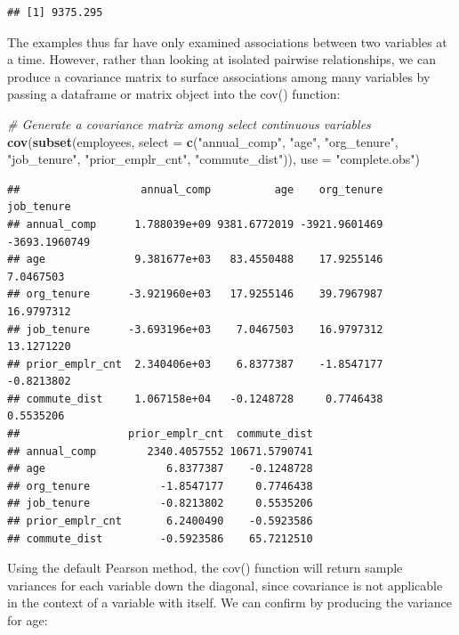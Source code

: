 \documentclass[]{book}
\newenvironment{Shaded}{\begin{snugshade}}{\end{snugshade}}
\newcommand{\CommentTok}[1]{\textcolor[rgb]{0.56,0.35,0.01}{\textit{#1}}}
\newcommand{\DataTypeTok}[1]{\textcolor[rgb]{0.13,0.29,0.53}{#1}}
\newcommand{\KeywordTok}[1]{\textcolor[rgb]{0.13,0.29,0.53}{\textbf{#1}}}
\newcommand{\NormalTok}[1]{#1}
\newcommand{\OperatorTok}[1]{\textcolor[rgb]{0.81,0.36,0.00}{\textbf{#1}}}
\newcommand{\StringTok}[1]{\textcolor[rgb]{0.31,0.60,0.02}{#1}}
\begin{document}
\begin{verbatim}
## [1] 9375.295
\end{verbatim}

The examples thus far have only examined associations between two variables at a time. However, rather than looking at isolated pairwise relationships, we can produce a covariance matrix to surface associations among many variables by passing a dataframe or matrix object into the cov() function:

\begin{Shaded}
\begin{Highlighting}[]
\CommentTok{# Generate a covariance matrix among select continuous variables}
\KeywordTok{cov}\NormalTok{(}\KeywordTok{subset}\NormalTok{(employees, }\DataTypeTok{select =} \KeywordTok{c}\NormalTok{(}\StringTok{"annual_comp"}\NormalTok{, }\StringTok{"age"}\NormalTok{, }\StringTok{"org_tenure"}\NormalTok{, }\StringTok{"job_tenure"}\NormalTok{, }\StringTok{"prior_emplr_cnt"}\NormalTok{, }\StringTok{"commute_dist"}\NormalTok{)), }\DataTypeTok{use =} \StringTok{"complete.obs"}\NormalTok{)}
\end{Highlighting}
\end{Shaded}

\begin{verbatim}
##                   annual_comp          age    org_tenure    job_tenure
## annual_comp      1.788039e+09 9381.6772019 -3921.9601469 -3693.1960749
## age              9.381677e+03   83.4550488    17.9255146     7.0467503
## org_tenure      -3.921960e+03   17.9255146    39.7967987    16.9797312
## job_tenure      -3.693196e+03    7.0467503    16.9797312    13.1271220
## prior_emplr_cnt  2.340406e+03    6.8377387    -1.8547177    -0.8213802
## commute_dist     1.067158e+04   -0.1248728     0.7746438     0.5535206
##                 prior_emplr_cnt  commute_dist
## annual_comp        2340.4057552 10671.5790741
## age                   6.8377387    -0.1248728
## org_tenure           -1.8547177     0.7746438
## job_tenure           -0.8213802     0.5535206
## prior_emplr_cnt       6.2400490    -0.5923586
## commute_dist         -0.5923586    65.7212510
\end{verbatim}

Using the default Pearson method, the cov() function will return sample variances for each variable down the diagonal, since covariance is not applicable in the context of a variable with itself. We can confirm by producing the variance for age:

\begin{Shaded}
\end{Shaded}
\end{document}
